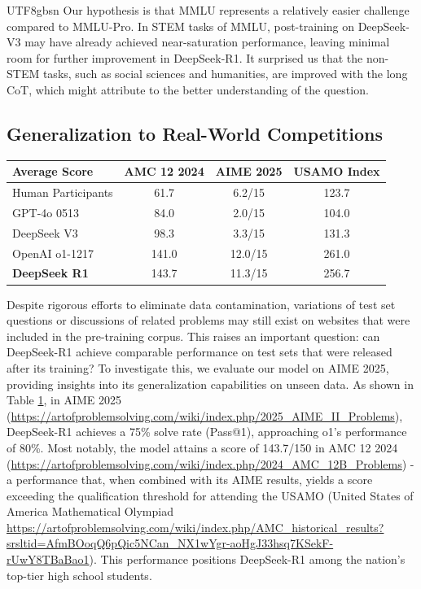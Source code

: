 \documentclass[11pt, a4paper, logo, copyright, nonumbering]{deepseek}
\newcommand{\dsri}{DeepSeek-R1}
\begin{document}
\begin{CJK*}{UTF8}{gbsn}
Our hypothesis is that MMLU represents a relatively easier challenge compared to MMLU-Pro. In STEM tasks of MMLU, post-training on DeepSeek-V3 may have already achieved near-saturation performance, leaving minimal room for further improvement in \dsri{}. It surprised us that the non-STEM tasks, such as social sciences and humanities, are improved with the long CoT, which might attribute to the better understanding of the question. 

\subsection{Generalization to Real-World Competitions}
\begin{table}[h]
    \centering
    \label{tab:math_2025_eval}
    \begin{tabular}{l|cc|c} \toprule
    Average Score & \textbf{AMC 12 2024} & \textbf{AIME 2025} & \textbf{USAMO Index}  \\    \midrule
    Human Participants & 61.7 & 6.2/15 & 123.7 \\
    \midrule
    GPT-4o 0513 & 84.0 & 2.0/15 & 104.0 \\
    DeepSeek V3 & 98.3 & 3.3/15 & 131.3 \\
    \midrule
    OpenAI o1-1217 & 141.0 & 12.0/15 & 261.0 \\
    \textbf{DeepSeek R1} & 143.7 & 11.3/15 & 256.7 \\
    \bottomrule
    \end{tabular}
\end{table}
\noindent
Despite rigorous efforts to eliminate data contamination, variations of test set questions or discussions of related problems may still exist on websites that were included in the pre-training corpus. This raises an important question: can \dsri{} achieve comparable performance on test sets that were released after its training? To investigate this, we evaluate our model on AIME 2025, providing insights into its generalization capabilities on unseen data.
As shown in Table \ref{tab:math_2025_eval}, in AIME 2025 (\url{https://artofproblemsolving.com/wiki/index.php/2025_AIME_II_Problems}), \dsri{} achieves a 75\% solve rate (Pass@1), approaching o1's performance of 80\%.
Most notably, the model attains a score of 143.7/150 in AMC 12 2024 (\url{https://artofproblemsolving.com/wiki/index.php/2024_AMC_12B_Problems}) - a performance that, when combined with its AIME results, yields a score exceeding the qualification threshold for attending the USAMO (United States of America Mathematical Olympiad \url{https://artofproblemsolving.com/wiki/index.php/AMC_historical_results?srsltid=AfmBOoqQ6pQic5NCan_NX1wYgr-aoHgJ33hsq7KSekF-rUwY8TBaBao1}).
This performance positions DeepSeek-R1 among the nation's top-tier high school students.


\end{CJK*}
\end{document}
